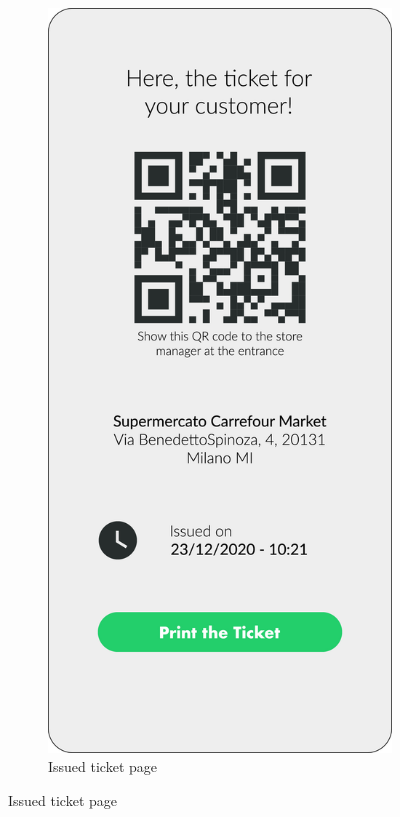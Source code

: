 \begin{figure}[H]
\begin{subfigure}[t]{0.28\textwidth}
    \end{subfigure}
    \quad
    \begin{subfigure}[t]{0.28\textwidth} 
        \includegraphics{../mockups/print_ticket}
        \caption*{Issued ticket page}
    \end{subfigure}
\end{figure}

